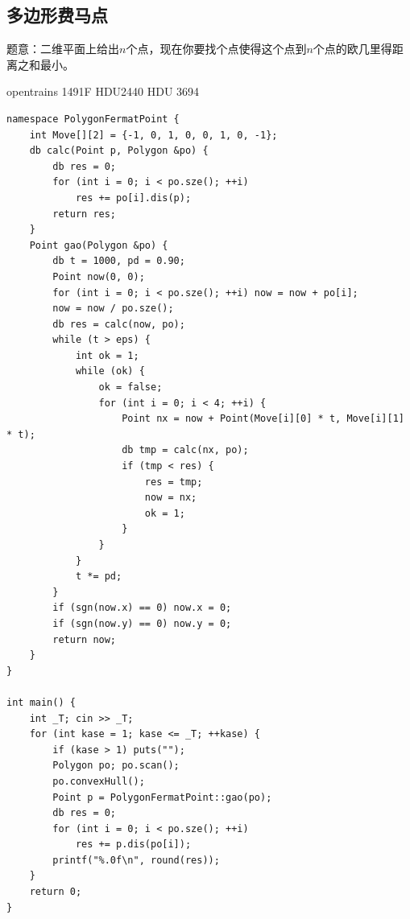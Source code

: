 \subsection{多边形费马点}
题意：二维平面上给出$n$个点，现在你要找个点使得这个点到$n$个点的欧几里得距离之和最小。\par
opentrains 1491F HDU2440 HDU 3694\par
\begin{lstlisting}
namespace PolygonFermatPoint {
	int Move[][2] = {-1, 0, 1, 0, 0, 1, 0, -1};
	db calc(Point p, Polygon &po) {
		db res = 0;
		for (int i = 0; i < po.sze(); ++i) 
			res += po[i].dis(p);
		return res;
	}
	Point gao(Polygon &po) {
		db t = 1000, pd = 0.90;
		Point now(0, 0);
		for (int i = 0; i < po.sze(); ++i) now = now + po[i];	
		now = now / po.sze(); 
		db res = calc(now, po);
		while (t > eps) {
			int ok = 1;
			while (ok) {
				ok = false;
				for (int i = 0; i < 4; ++i) {
					Point nx = now + Point(Move[i][0] * t, Move[i][1] * t);
					db tmp = calc(nx, po);
					if (tmp < res) {
						res = tmp;
						now = nx;
						ok = 1;
					}
				}
			}
			t *= pd;
		}
		if (sgn(now.x) == 0) now.x = 0;
		if (sgn(now.y) == 0) now.y = 0;
		return now;
	}
}

int main() {
	int _T; cin >> _T;
	for (int kase = 1; kase <= _T; ++kase) {
		if (kase > 1) puts(""); 
		Polygon po; po.scan();
		po.convexHull();
		Point p = PolygonFermatPoint::gao(po);
		db res = 0;
		for (int i = 0; i < po.sze(); ++i)
			res += p.dis(po[i]);
		printf("%.0f\n", round(res));
	}
	return 0;
}
\end{lstlisting}

